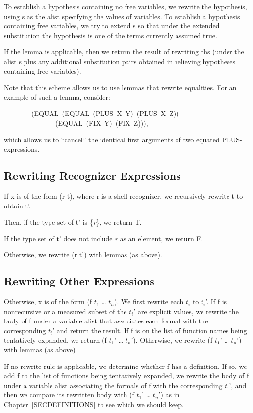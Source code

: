 \documentclass[10pt]{book}
\newenvironment{pubasis}{\begin{flushleft}}{\end{flushleft}}
\begin{document}
To establish a hypothesis containing no free variables,
we rewrite the hypothesis, using s as the alist
specifying the values of variables.
To establish a hypothesis containing free variables,
we try to extend s so that under the extended substitution
the hypothesis is one of the terms currently assumed
true.

If the lemma is applicable, then we return the result of
rewriting rhs (under the alist s plus any additional
substitution pairs obtained in relieving hypotheses
containing free-variables).

Note that this scheme allows us to use lemmas that rewrite equalities.
For an example of such a lemma, consider:
\begin{pubasis}
~~~~~~~~(EQUAL~(EQUAL~(PLUS~X~Y)~(PLUS~X~Z))\\
~~~~~~~~~~~~~~~(EQUAL~(FIX~Y)~(FIX~Z))),\\
\end{pubasis}
which allows us to ``cancel'' the identical first arguments of two
equated PLUS-expressions.

\subsection{Rewriting Recognizer Expressions}
If x is of the form (r t), where r is a shell recognizer, we
recursively rewrite t to obtain t'.

Then, if the type set of t' is \{\emph{r}\}, we return T.

If the type set of t' does not include \emph{r} as an element, we return F.

Otherwise, we rewrite (r t') with lemmas (as above).

\subsection{Rewriting Other Expressions}
Otherwise, x is of the form (f $t_{1}$ \ldots{} $t_{n}$).  We first rewrite each
$t_{i}$ to $t_{i}$'.
If f is nonrecursive
or a measured subset of the $t_{i}$' are explicit values, we 
rewrite the body of f under
a variable alist that associates each formal with the corresponding
$t_{i}$' and return the result.  If f is on the list of function
names  being tentatively expanded, we return (f $t_{1}$' \ldots{} $t_{n}$').
Otherwise, we rewrite (f $t_{1}$' \ldots{} $t_{n}$') with lemmas
(as above).

If no rewrite rule is applicable,  we determine whether f has a definition.
If so, we
add f to the list of functions being tentatively expanded,
we rewrite the body of f under a variable alist
associating the formals of f with the corresponding
$t_{i}$', and then we compare its rewritten body with
(f $t_{1}$' \ldots{} $t_{n}$') as in Chapter~\ref{SECDEFINITIONS}
to see which 
we should keep.
\end{document}
